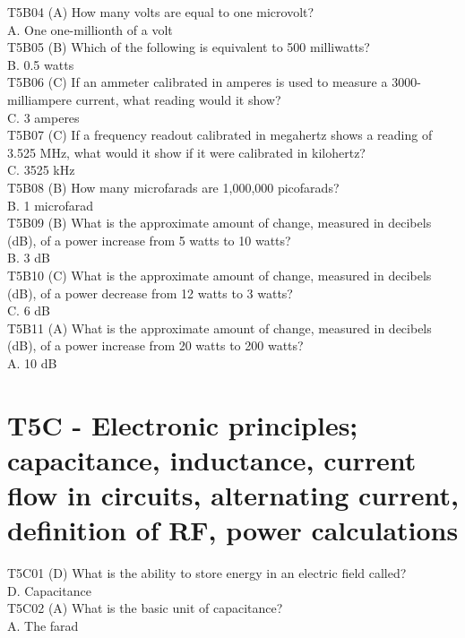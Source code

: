 \documentclass[12pt,letterpaper]{report}
\begin{document}
T5B04 (A) How many volts are equal to one microvolt?\\
A. One one-millionth of a volt\\

T5B05 (B) Which of the following is equivalent to 500 milliwatts?\\
B. 0.5 watts\\

T5B06 (C) If an ammeter calibrated in amperes is used to measure a 3000-milliampere current, what reading would it show?\\
C. 3 amperes\\

T5B07 (C) If a frequency readout calibrated in megahertz shows a reading of 3.525 MHz, what would it show if it were calibrated in kilohertz? \\
C. 3525 kHz\\

T5B08 (B) How many microfarads are 1,000,000 picofarads?\\
B. 1 microfarad\\

T5B09 (B) What is the approximate amount of change, measured in decibels (dB), of a power increase from 5 watts to 10 watts?\\
B. 3 dB\\

T5B10 (C) What is the approximate amount of change, measured in decibels (dB), of a power decrease from 12 watts to 3 watts?\\
C. 6 dB\\

T5B11 (A) What is the approximate amount of change, measured in decibels (dB), of a power increase from 20 watts to 200 watts?\\
A. 10 dB\\

\section{T5C - Electronic principles; capacitance, inductance, current flow in circuits, alternating current, definition of RF, power calculations}

T5C01 (D) What is the ability to store energy in an electric field called?\\
D. Capacitance\\

T5C02 (A) What is the basic unit of capacitance?\\
A. The farad\\
\end{document}
